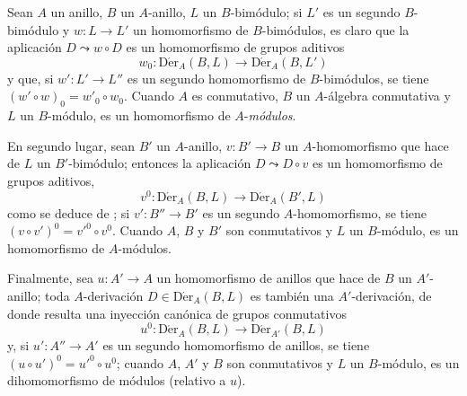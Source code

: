 \begin{env}[20.2.1]
\label{0.20.2.1-fr}
Sean $A$ un anillo, $B$ un $A$-anillo, $L$ un $B$-bimódulo; si $L'$ es
un segundo $B$-bimódulo y $w:L\to L'$ un homomorfismo de $B$-bimódulos, es
claro que la aplicación $D\leadsto w\circ D$ es un homomorfismo de
grupos aditivos
\begin{equation}
\tag{20.2.1.1}
\label{0.20.2.1.1-fr}
  w_0:\operatorname{D\acute{e}r}_A(B,L)\to\operatorname{D\acute{e}r}_A(B,L')
\end{equation}
y que, si $w':L'\to L''$ es un segundo homomorfismo de $B$-bimódulos, se tiene
$(w'\circ w)_0=w'_0\circ w_0$. Cuando $A$ es conmutativo, $B$ un
$A$-álgebra conmutativa y $L$ un $B$-módulo,  es un
homomorfismo de $A$-\emph{módulos}.

En segundo lugar, sean $B'$ un $A$-anillo, $v:B'\to B$ un
$A$-homomorfismo que hace de $L$ un $B'$-bimódulo; entonces la aplicación
$D\leadsto D\circ v$ es un homomorfismo de grupos aditivos,
\begin{equation}
\tag{20.2.1.2}
\label{0.20.2.1.2-fr}
  v^0:\operatorname{D\acute{e}r}_A(B,L)\to\operatorname{D\acute{e}r}_A(B',L)
\end{equation}
como se deduce de ; si $v':B''\to B'$ es un segundo
$A$-homomorfismo, se tiene $(v\circ v')^0=v'^0\circ v^0$. Cuando $A$, $B$ y
$B'$ son conmutativos y $L$ un $B$-módulo,  es un
homomorfismo de $A$-módulos.

Finalmente, sea $u:A'\to A$ un homomorfismo de anillos que hace de $B$ un
$A'$-anillo; toda $A$-derivación $D\in\operatorname{D\acute{e}r}_A(B,L)$ es también
una $A'$-derivación, de donde resulta una inyección canónica de grupos conmutativos
\begin{equation}
\tag{20.2.1.3}
\label{0.20.2.1.3-fr}
  u^0:\operatorname{D\acute{e}r}_A(B,L)\to\operatorname{D\acute{e}r}_{A'}(B,L)
\end{equation}
y, si $u':A''\to A'$ es un segundo homomorfismo de anillos, se tiene
$(u\circ u')^0=u'^0\circ u^0$; cuando $A$, $A'$ y $B$ son conmutativos y
$L$ un $B$-módulo,  es un dihomomorfismo de módulos
(relativo a $u$).


\end{env}
